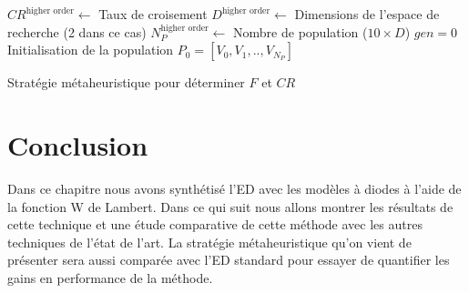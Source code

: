\begin{algorithm}[H]
  $CR^{\text{higher order}} \gets$ Taux de croisement\;
  $D^{\text{higher order}} \gets$ Dimensions de l'espace de recherche (2 dans ce cas)\;
  $N_{P}^{\text{higher order}} \gets$ Nombre de population ($10 \times D$)\;
  $gen = 0$\;
  Initialisation de la population $P_0 = [V_0, V_1, .., V_{N_P}]$\;
  \caption{Stratégie métaheuristique pour déterminer $F$ et $CR$}
  \label{alg:metaheuristic}
\end{algorithm}

\section{Conclusion}
Dans ce chapitre nous avons synthétisé l'ED avec les modèles à diodes à l'aide de la fonction W de Lambert. Dans ce qui suit nous allons montrer les résultats de cette technique et une étude comparative de cette méthode avec les autres techniques de l'état de l'art. La stratégie métaheuristique qu'on vient de présenter sera aussi comparée avec l'ED standard pour essayer de quantifier les gains en performance de la méthode.

